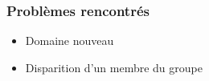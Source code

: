 
\begin{frame}
	\frametitle{Problèmes rencontrés}
	\begin{itemize}
		\item Domaine nouveau
		\item Disparition d'un membre du groupe
	\end{itemize}
\end{frame}


